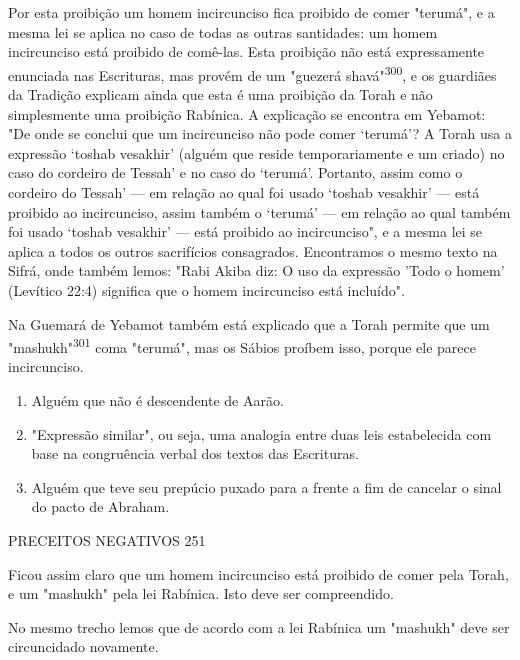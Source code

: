 \begin{itemize}
\begin{enumrate}
\begin{itemize}
\begin{itemize}
\begin{itemize}
Por esta proibição um homem incircunciso fica proibido de comer
"terumá", e a mesma lei se aplica no caso de todas as outras santidades:
um homem incircunciso está proibido de comê-las. Esta proibição não está
expres­samente enunciada nas Escrituras, mas provém de um "guezerá
shavá"\textsuperscript{300}, e os guardiães da Tradição explicam ainda
que esta é uma proibição da Torah e não simplesmente uma proibição
Rabínica. A explicação se encontra em Ye­bamot: "De onde se conclui que
um incircunciso não pode comer `terumá'? A Torah usa a expressão `toshab
vesakhir' (alguém que reside temporariamente e um criado) no caso do
cordeiro de Tessah' e no caso do `terumá'. Portanto, assim como o
cordeiro do Tessah' --- em relação ao qual foi usado `toshab ve­sakhir'
--- está proibido ao incircunciso, assim também o `terumá' --- em
rela­ção ao qual também foi usado `toshab vesakhir' --- está proibido ao
incircunci­so", e a mesma lei se aplica a todos os outros sacrifícios
consagrados. Encon­tramos o mesmo texto na Sifrá, onde também lemos:
"Rabi Akiba diz: O uso da expressão 'Todo o homem' (Levítico 22:4)
significa que o homem incircun­ciso está incluído".

Na Guemará de Yebamot também está explicado que a Torah per­mite que um
"mashukh"\textsuperscript{301} coma "terumá", mas os Sábios proíbem
isso, por­que ele parece incircunciso.


\begin{enumerate}
\def\labelenumi{\arabic{enumi}.}
\setcounter{enumi}{298}
\item
 
 Alguém que não é descendente de Aarão.
 
\item
 
 "Expressão similar", ou seja, uma analogia entre duas leis
 estabelecida com base na congruência verbal dos textos das Escrituras.
 
\item
 
 Alguém que teve seu prepúcio puxado para a frente a fim de cancelar o
 sinal do pacto de Abraham.
 
\end{enumerate}


PRECEITOS NEGATIVOS 251

Ficou assim claro que um homem incircunciso está proibido de co­mer pela
Torah, e um "mashukh" pela lei Rabínica. Isto deve ser compreendido.

No mesmo trecho lemos que de acordo com a lei Rabínica um "mas­hukh"
deve ser circuncidado novamente.


\end{itemize}
\end{itemize}
\end{itemize}
\end{enumrate}
\end{itemize}
